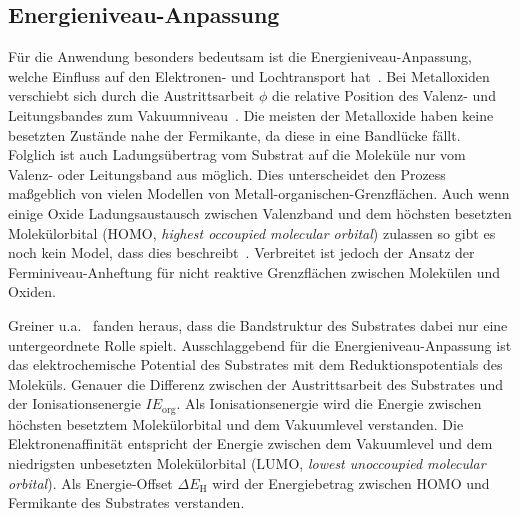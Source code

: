         \subsection{Energieniveau-Anpassung} \label{sec:ENA}
            Für die Anwendung besonders bedeutsam ist die Energieniveau-Anpassung, welche Einfluss auf den Elektronen- und Lochtransport hat~\cite{IF_4}.
            Bei Metalloxiden verschiebt sich durch die Austrittsarbeit $\phi$ die relative Position des Valenz- und Leitungsbandes zum Vakuumniveau~\cite{IF_3}.
            Die meisten der Metalloxide haben keine besetzten Zustände nahe der Fermikante, da diese in eine Bandlücke fällt.
            Folglich ist auch Ladungsübertrag vom Substrat auf die Moleküle nur vom Valenz- oder Leitungsband aus möglich.
            Dies unterscheidet den Prozess maßgeblich von vielen Modellen von Metall-organischen-Grenzflächen.
            Auch wenn einige Oxide Ladungsaustausch zwischen Valenzband und dem höchsten besetzten Molekülorbital (HOMO, \textit{highest occoupied molecular orbital}) zulassen so  gibt es noch kein Model, dass dies beschreibt~\cite{IF_3}.
            Verbreitet ist jedoch der Ansatz der Ferminiveau-Anheftung für nicht reaktive Grenzflächen zwischen Molekülen und Oxiden.

            Greiner u.a.~\cite{IF_3} fanden heraus, dass die Bandstruktur des Substrates dabei nur eine untergeordnete Rolle spielt.
            Ausschlaggebend für die Energieniveau-Anpassung ist das elektrochemische Potential des Substrates mit dem Reduktionspotentials des Moleküls.
            Genauer die Differenz zwischen der Austrittsarbeit des Substrates und der Ionisationsenergie $IE_\text{org}$.
            Als Ionisationsenergie wird die Energie zwischen höchsten besetztem Molekülorbital und dem Vakuumlevel verstanden.
            Die Elektronenaffinität entspricht der Energie zwischen dem Vakuumlevel und dem niedrigsten unbesetzten Molekülorbital (LUMO, \textit{lowest unoccoupied molecular orbital}).
            Als Energie-Offset $\Delta E_\text{H}$ wird der Energiebetrag zwischen HOMO und Fermikante des Substrates verstanden.

